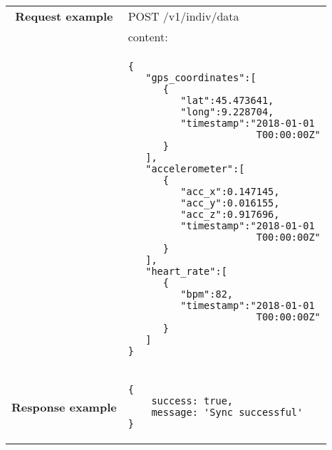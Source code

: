\begin{adjustwidth}{1cm}{}
\begin{longtable}{|c|l|}
            \hline
             \textbf{Request example}
             & POST /v1/indiv/data \\
             & content: \\
            & \begin{minipage}[t]{0.5\textwidth}
                \begin{adjustwidth}{1.5cm}{}
                \begin{verbatim}
{
   "gps_coordinates":[
      {
         "lat":45.473641,
         "long":9.228704,
         "timestamp":"2018-01-01
                      T00:00:00Z"
      }
   ],
   "accelerometer":[
      {
         "acc_x":0.147145,
         "acc_y":0.016155,
         "acc_z":0.917696,
         "timestamp":"2018-01-01
                      T00:00:00Z"
      }
   ],
   "heart_rate":[
      {
         "bpm":82,
         "timestamp":"2018-01-01
                      T00:00:00Z"
      }
   ]
}
                \end{verbatim}
                \end{adjustwidth}
              \end{minipage} \\
              \hline
             \textbf{Response example} & 
              \begin{minipage}[t]{0.5\textwidth}
                \begin{adjustwidth}{1.5cm}{}
                \begin{verbatim}
{
    success: true, 
    message: 'Sync successful'
}
                \end{verbatim}
                \end{adjustwidth}
              \end{minipage} \\
              \hline
        \end{longtable}
    \end{adjustwidth}
    
